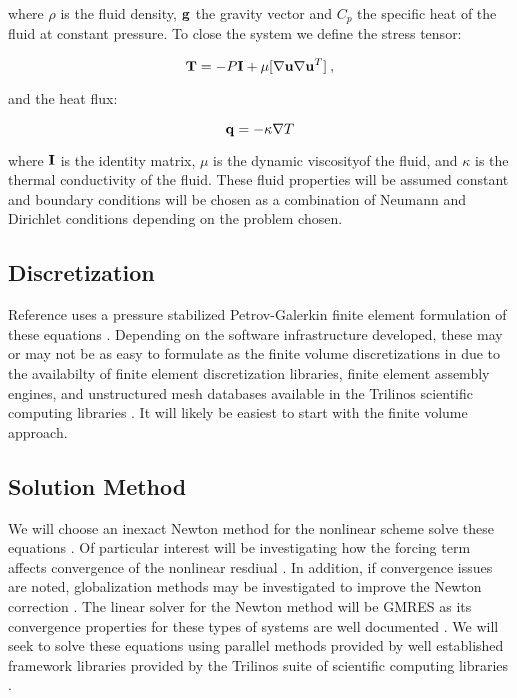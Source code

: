 \documentclass[letterpaper,12pt]{article}
\begin{document}
where $\rho$ is the fluid density, $\mathbf{g}$ the gravity vector and
$C_p$ the specific heat of the fluid at constant pressure. To close
the system we define the stress tensor:

\begin{equation}
  \mathbf{T} = -P \mathbf{I} + \mu [ \nabla \mathbf{u} \nabla \mathbf{u}^{T} ] \:,
  \label{eq:stress_tensor}
\end{equation}

and the heat flux:

\begin{equation}
  \mathbf{q} = -\kappa \nabla T
  \label{eq:heat_flux}
\end{equation}

where $\mathbf{I}$ is the identity matrix, $\mu$ is the dynamic
viscosityof the fluid, and $\kappa$ is the thermal conductivity of the
fluid. These fluid properties will be assumed constant and boundary
conditions will be chosen as a combination of Neumann and Dirichlet
conditions depending on the problem chosen.

\subsection{Discretization}
Reference \cite{shadid_1997} uses a pressure stabilized
Petrov-Galerkin finite element formulation of these equations
\cite{hughes_1986}. Depending on the software infrastructure
developed, these may or may not be as easy to formulate as the finite
volume discretizations in \cite{mchugh_1994} due to the availabilty of
finite element discretization libraries, finite element assembly
engines, and unstructured mesh databases available in the Trilinos
scientific computing libraries \cite{trilinos_2005}. It will likely be
easiest to start with the finite volume approach.

\subsection{Solution Method}
We will choose an inexact Newton method for the nonlinear scheme solve
these equations \cite{dembo_1982}. Of particular interest will be
investigating how the forcing term affects convergence of the
nonlinear resdiual \cite{eisenstat_1996}. In addition, if convergence
issues are noted, globalization methods may be investigated to improve
the Newton correction \cite{pawlowski_2006}. The linear solver for the
Newton method will be GMRES as its convergence properties for these
types of systems are well documented \cite{saad_1986}. We will seek to
solve these equations using parallel methods provided by well
established framework libraries provided by the Trilinos suite of
scientific computing libraries \cite{trilinos_2005}.
\end{document}
